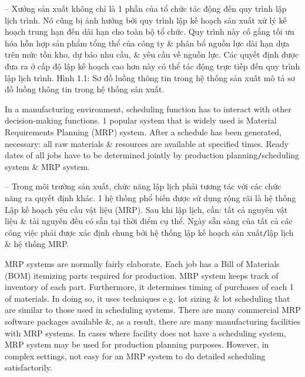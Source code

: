 \documentclass{article}
\begin{document}
\begin{itemize}
\begin{itemize}
\begin{itemize}
            -- Xưởng sản xuất không chỉ là 1 phần của tổ chức tác động đến quy trình lập lịch trình. Nó cũng bị ảnh hưởng bởi quy trình lập kế hoạch sản xuất xử lý kế hoạch trung hạn đến dài hạn cho toàn bộ tổ chức. Quy trình này cố gắng tối ưu hóa hỗn hợp sản phẩm tổng thể của công ty \& phân bổ nguồn lực dài hạn dựa trên mức tồn kho, dự báo nhu cầu, \& yêu cầu về nguồn lực. Các quyết định được đưa ra ở cấp độ lập kế hoạch cao hơn này có thể tác động trực tiếp đến quy trình lập lịch trình. {\sf Hình 1.1: Sơ đồ luồng thông tin trong hệ thống sản xuất} mô tả sơ đồ luồng thông tin trong hệ thống sản xuất.

            In a manufacturing environment, scheduling function has to interact with other decision-making functions. 1 popular system that is widely used is Material Requirements Planning (MRP) system. After a schedule has been generated, necessary: all raw materials \& resources are available at specified times. Ready dates of all jobs have to be determined jointly by production planning{\tt/}scheduling system \& MRP system.

            -- Trong môi trường sản xuất, chức năng lập lịch phải tương tác với các chức năng ra quyết định khác. 1 hệ thống phổ biến được sử dụng rộng rãi là hệ thống Lập kế hoạch yêu cầu vật liệu (MRP). Sau khi lập lịch, cần: tất cả nguyên vật liệu \& tài nguyên đều có sẵn tại thời điểm cụ thể. Ngày sẵn sàng của tất cả các công việc phải được xác định chung bởi hệ thống lập kế hoạch sản xuất{\tt/}lập lịch \& hệ thống MRP.

            MRP systems are normally fairly elaborate. Each job has a Bill of Materials (BOM) itemizing parts required for production. MRP system keeps track of inventory of each part. Furthermore, it determines timing of purchases of each 1 of materials. In doing so, it uses techniques e.g. lot sizing \& lot scheduling that are similar to those used in scheduling systems. There are many commercial MRP software packages available \&, as a result, there are many manufacturing facilities with MRP systems. In cases where facility does not have a scheduling system, MRP system may be used for production planning purposes. However, in complex settings, not easy for an MRP system to do detailed scheduling satisfactorily.


\end{itemize}
\end{itemize}
\end{itemize}
\end{document}
